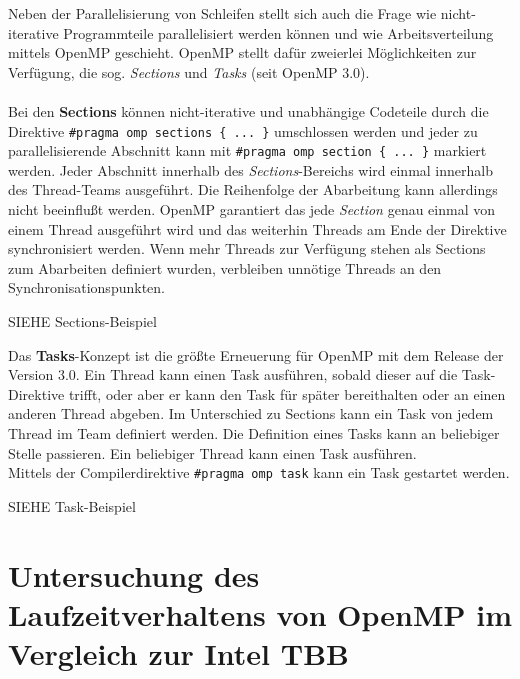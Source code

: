 \documentclass[11pt]{scrartcl}
\begin{document}
Neben der Parallelisierung von Schleifen stellt sich auch die Frage wie nicht-iterative Programmteile parallelisiert werden können und  wie Arbeitsverteilung mittels OpenMP geschieht. OpenMP stellt dafür zweierlei Möglichkeiten zur Verfügung, die sog. \textit{Sections} und \textit{Tasks} (seit OpenMP 3.0). \\
\\
Bei den \textbf{Sections} können nicht-iterative und unabhängige Codeteile durch die Direktive \texttt{\#pragma omp sections \{ ... \}} umschlossen werden und jeder zu parallelisierende Abschnitt kann mit \texttt{\#pragma omp section \{ ... \}} markiert werden. Jeder Abschnitt innerhalb des \textit{Sections}-Bereichs wird einmal innerhalb des Thread-Teams ausgeführt. Die Reihenfolge der Abarbeitung kann allerdings nicht beeinflußt werden. OpenMP garantiert das jede \textit{Section} genau einmal von einem Thread ausgeführt wird und das weiterhin Threads am Ende der Direktive synchronisiert werden. Wenn mehr Threads zur Verfügung stehen als Sections zum Abarbeiten definiert wurden, verbleiben unnötige Threads an den Synchronisationspunkten.

SIEHE Sections-Beispiel

Das \textbf{Tasks}-Konzept ist die größte Erneuerung für OpenMP mit dem Release der Version 3.0. Ein Thread kann einen Task ausführen, sobald dieser auf die Task-Direktive trifft, oder aber er kann den Task für später bereithalten oder an einen anderen Thread abgeben. Im Unterschied zu Sections kann ein Task von jedem Thread im Team definiert werden. Die Definition eines Tasks kann an beliebiger Stelle passieren. Ein beliebiger Thread kann einen Task ausführen. \\
Mittels der Compilerdirektive \texttt{\#pragma omp task} kann ein Task gestartet werden. 

SIEHE Task-Beispiel 

\pagebreak %



\section{Untersuchung des Laufzeitverhaltens von OpenMP im Vergleich zur Intel TBB}
\end{document}
